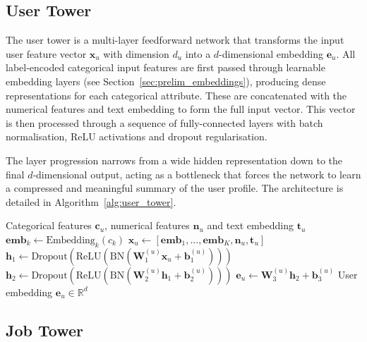 \subsection{User Tower}
\label{sec:user_tower}

The user tower is a multi-layer feedforward network that transforms the input user feature vector $\mathbf{x}_u$ with dimension $d_u$ into a $d$-dimensional embedding $\mathbf{e}_u$. All label-encoded categorical input features are first passed through learnable embedding layers (see Section~\ref{sec:prelim_embeddings}), producing dense representations for each categorical attribute. These are concatenated with the numerical features and text embedding to form the full input vector. This vector is then processed through a sequence of fully-connected layers with batch normalisation, ReLU activations and dropout regularisation.

The layer progression narrows from a wide hidden representation down to the final $d$-dimensional output, acting as a bottleneck that forces the network to learn a compressed and meaningful summary of the user profile. The architecture is detailed in Algorithm~\ref{alg:user_tower}.

\begin{algorithm}[H]
\caption{User Tower Forward Pass}
\label{alg:user_tower}
\begin{algorithmic}[1]
\Require Categorical features $\mathbf{c}_u$, numerical features $\mathbf{n}_u$ and text embedding $\mathbf{t}_u$
    \State $\mathbf{emb}_k \gets \text{Embedding}_{k}(c_k)$
\EndFor
\State $\mathbf{x}_u \gets [\mathbf{emb}_1, \ldots, \mathbf{emb}_K, \mathbf{n}_u, \mathbf{t}_u]$ 
\State $\mathbf{h}_1 \gets \text{Dropout}(\text{ReLU}(\text{BN}(\mathbf{W}_1^{(u)} \mathbf{x}_u + \mathbf{b}_1^{(u)})))$
\State $\mathbf{h}_2 \gets \text{Dropout}(\text{ReLU}(\text{BN}(\mathbf{W}_2^{(u)} \mathbf{h}_1 + \mathbf{b}_2^{(u)})))$
\State $\mathbf{e}_u \gets \mathbf{W}_3^{(u)} \mathbf{h}_2 + \mathbf{b}_3^{(u)}$
\Ensure User embedding $\mathbf{e}_u \in \mathbb{R}^d$
\end{algorithmic}
\end{algorithm}

\subsection{Job Tower}
\label{sec:job_tower}

